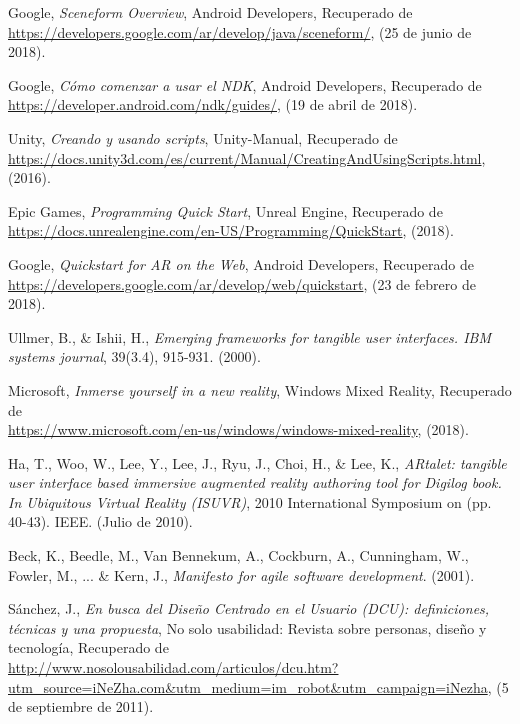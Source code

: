 Google, {\em Sceneform Overview}, Android Developers, Recuperado de \\
\url{https://developers.google.com/ar/develop/java/sceneform/}, (25 de junio de 2018).

Google, {\em Cómo comenzar a usar el NDK}, Android Developers, Recuperado de \\
\url{https://developer.android.com/ndk/guides/}, (19 de abril de 2018).

Unity, {\em Creando y usando scripts}, Unity-Manual, Recuperado de \\
\url{https://docs.unity3d.com/es/current/Manual/CreatingAndUsingScripts.html}, (2016).

Epic Games, {\em Programming Quick Start}, Unreal Engine, Recuperado de \\
\url{https://docs.unrealengine.com/en-US/Programming/QuickStart}, (2018).

Google, {\em Quickstart for AR on the Web}, Android Developers, Recuperado de \\
\url{https://developers.google.com/ar/develop/web/quickstart}, (23 de febrero de 2018).

Ullmer, B., & Ishii, H., {\em Emerging frameworks for tangible user interfaces. IBM systems journal}, 39(3.4), 915-931. (2000).

Microsoft, {\em Inmerse yourself in a new reality}, Windows Mixed Reality, Recuperado de \\
\url{https://www.microsoft.com/en-us/windows/windows-mixed-reality}, (2018).

Ha, T., Woo, W., Lee, Y., Lee, J., Ryu, J., Choi, H., & Lee, K., {\em ARtalet: tangible user interface based immersive augmented reality authoring tool for Digilog book. In Ubiquitous Virtual Reality (ISUVR)}, 2010 International Symposium on (pp. 40-43). IEEE. (Julio de 2010).

Beck, K., Beedle, M., Van Bennekum, A., Cockburn, A., Cunningham, W., Fowler, M., ... & Kern, J., {\em Manifesto for agile software development}. (2001).

Sánchez, J., {\em En busca del Diseño Centrado en el Usuario (DCU): definiciones, técnicas y una propuesta}, No solo usabilidad: Revista sobre personas, diseño y tecnología, Recuperado de \\
\url{http://www.nosolousabilidad.com/articulos/dcu.htm?utm_source=iNeZha.com&utm_medium=im_robot&utm_campaign=iNezha}, (5 de septiembre de 2011).
